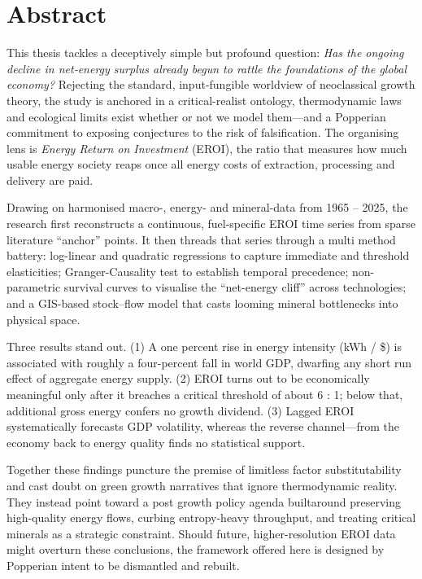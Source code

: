 \documentclass[a4paper,12pt]{article}
\begin{document}
\section*{Abstract}
This thesis tackles a deceptively simple but profound question: \emph{Has the
ongoing decline in net‐energy surplus already begun to rattle the foundations
of the global economy?}  Rejecting the standard, input-fungible worldview of
neoclassical growth theory, the study is anchored in a critical-realist
ontology, thermodynamic laws and ecological limits exist whether or not we
model them—and a Popperian commitment to exposing conjectures to the risk of
falsification.  The organising lens is \textit{Energy Return on Investment}
(EROI), the ratio that measures how much usable energy society reaps once all
energy costs of extraction, processing and delivery are paid.

Drawing on harmonised macro-, energy- and mineral-data from 1965 – 2025, the
research first reconstructs a continuous, fuel-specific EROI time series from
sparse literature “anchor” points.  It then threads that series through a
multi method battery: log-linear and quadratic regressions to capture
immediate and threshold elasticities;  Granger-Causality test to
establish temporal precedence; non-parametric survival curves to visualise the
“net-energy cliff” across technologies; and a GIS-based stock–flow model that
casts looming mineral bottlenecks into physical space.

Three results stand out.  (1) A one percent rise in energy intensity
(kWh / \$) is associated with roughly a four-percent fall in world GDP, dwarfing
any short run effect of aggregate energy supply.  (2) EROI turns out to be
economically meaningful only after it breaches a critical threshold of about
6 : 1; below that, additional gross energy confers no growth dividend.  (3)
Lagged EROI systematically forecasts GDP volatility, whereas the reverse
channel—from the economy back to energy quality finds no statistical support.

Together these findings puncture the premise of limitless factor
substitutability and cast doubt on green growth narratives that ignore
thermodynamic reality.  They instead point toward a post growth policy agenda builtaround preserving high-quality energy flows, curbing entropy-heavy throughput, and treating critical minerals as a strategic constraint.  Should future, higher-resolution EROI data might overturn these conclusions, the framework offered here is designed by Popperian intent to be dismantled and rebuilt.
\end{document}

